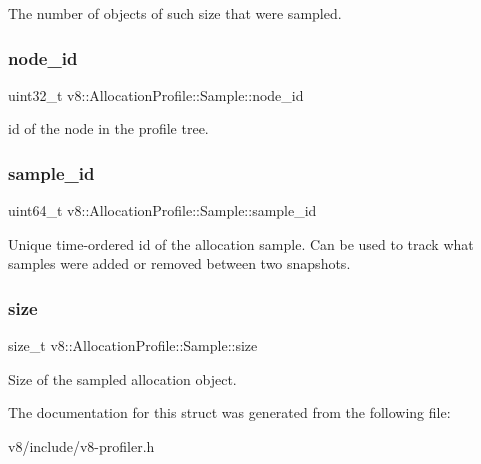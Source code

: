 The number of objects of such size that were sampled. \mbox{\label{structv8_1_1AllocationProfile_1_1Sample_ab84cfd942c2b6d42f25874b5008cfc35}} 
\subsubsection{\texorpdfstring{node\+\_\+id}{node\_id}}
{\footnotesize\ttfamily uint32\+\_\+t v8\+::\+Allocation\+Profile\+::\+Sample\+::node\+\_\+id}

id of the node in the profile tree. \mbox{\label{structv8_1_1AllocationProfile_1_1Sample_afc21641115d4a9684363ac873750422c}} 
\subsubsection{\texorpdfstring{sample\+\_\+id}{sample\_id}}
{\footnotesize\ttfamily uint64\+\_\+t v8\+::\+Allocation\+Profile\+::\+Sample\+::sample\+\_\+id}

Unique time-\/ordered id of the allocation sample. Can be used to track what samples were added or removed between two snapshots. \mbox{\label{structv8_1_1AllocationProfile_1_1Sample_aa8775ce782c6fcc5a20922f604190dd5}} 
\subsubsection{\texorpdfstring{size}{size}}
{\footnotesize\ttfamily size\+\_\+t v8\+::\+Allocation\+Profile\+::\+Sample\+::size}

Size of the sampled allocation object. 

The documentation for this struct was generated from the following file\+:\begin{DoxyCompactItemize}
\item 
v8/include/v8-\/profiler.\+h\end{DoxyCompactItemize}
